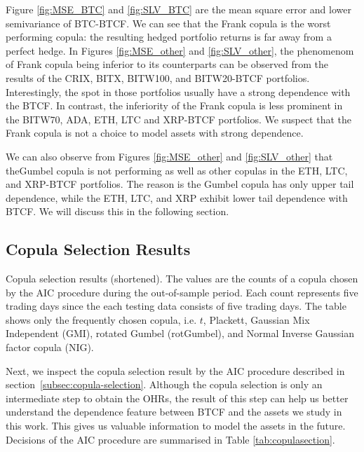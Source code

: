 
Figure \ref{fig:MSE_BTC} and \ref{fig:SLV_BTC} are the mean square
error and lower semivariance of BTC-BTCF. We can see that the Frank copula
is the worst performing copula: 
the resulting hedged portfolio returns is far away from a perfect
hedge. 
In Figures \ref{fig:MSE_other} and \ref{fig:SLV_other}, the phenomenom
of Frank copula being inferior to its counterparts can be observed
from the results of the CRIX, BITX, BITW100, and BITW20-BTCF
portfolios. 
Interestingly, the spot in those portfolios usually have a strong
dependence with the BTCF.
In contrast, the inferiority of the Frank copula is less prominent in
the BITW70, ADA, ETH, LTC and XRP-BTCF portfolios. 
We suspect that the Frank copula is not a choice to model assets with
strong dependence.

We can also observe from Figures \ref{fig:MSE_other} and
\ref{fig:SLV_other} that theGumbel copula is not performing as well as 
other copulas in the ETH, LTC, and XRP-BTCF portfolios. 
The reason is the Gumbel copula has only upper tail dependence,
while the ETH, LTC, and XRP exhibit lower tail dependence with BTCF. 
We will discuss this in the following section.

\subsection{Copula Selection Results}\label{subsec:-copula-results}
\begin{table}[t]

 \caption{Copula selection results (shortened).
        The values are the counts of a copula chosen by the AIC procedure during the out-of-sample period.
        Each count represents five trading days since the each testing data consists of five trading days.
        The table shows only the frequently chosen copula, i.e. $t$, Plackett, Gaussian Mix Independent (GMI), rotated Gumbel (rotGumbel), and
        Normal Inverse Gaussian factor copula (NIG).
        }
    \label{tab:copulasection}
\end{table}
Next, we inspect the copula selection result by the AIC procedure described in section~\ref{subsec:copula-selection}.
Although the copula selection is only an intermediate step to obtain the OHRs,
the result of this step can help us better understand the dependence
feature between BTCF and the assets we study in this work.
This gives us valuable information to model the assets in the future.
Decisions of the AIC procedure are summarised in Table \ref{tab:copulasection}. \medskip

